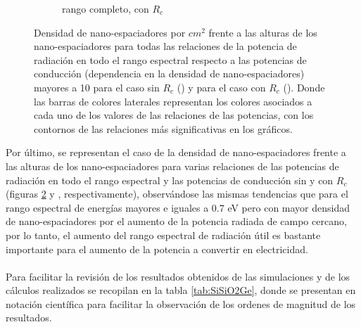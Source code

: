 \begin{figure}[H]
\begin{subfigure}[b]{0.49\textwidth}
			\caption{rango completo, con $R_c$}
			\label{fig:rel_SiSiO2Ge_Rc_full}
		\end{subfigure}
	\caption{Densidad de nano-espaciadores por $cm^2$ frente a las alturas de los nano-espaciadores para todas las relaciones de la potencia de radiación en todo el rango espectral respecto a las potencias de conducción (dependencia en la densidad de nano-espaciadores) mayores a 10 para el caso sin $R_c$ () y para el caso con $R_c$ (). Donde las barras de colores laterales representan los colores asociados a cada uno de los valores de las relaciones de las potencias, con los contornos de las relaciones más significativas en los gráficos.}%
	\label{fig:rels_SiSiO2Ge_full}%
\end{figure}
Por último, se representan el caso de la densidad de nano-espaciadores frente a las alturas de los nano-espaciadores para varias relaciones de las potencias de radiación en todo el rango espectral y las potencias de conducción sin y con $R_c$ (figuras \ref{fig:rels_SiSiO2Ge_full}   y , respectivamente), observándose las mismas tendencias que para el rango espectral de energías mayores e iguales a 0.7 eV pero con mayor densidad de nano-espaciadores por el aumento de la potencia radiada de campo cercano, por lo tanto, el aumento del rango espectral de radiación útil es bastante importante para el aumento de la potencia a convertir en electricidad.\\\\
Para facilitar la revisión de los resultados obtenidos de las simulaciones y de los cálculos realizados se recopilan en la tabla \ref{tab:SiSiO2Ge}, donde se presentan en notación científica para facilitar la observación de los ordenes de magnitud de los resultados.
